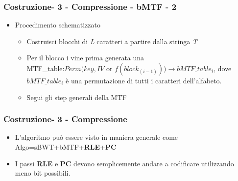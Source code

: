 \documentclass{beamer}
\begin{document}
\begin{frame}
\frametitle{Costruzione- 3 - Compressione - bMTF - 2}
	\begin{itemize}
	\item Procedimento schematizzato\pause
		\begin{itemize}
			\item Costruisci blocchi di \textit{L} caratteri a partire dalla stringa \textit{T}\pause
			\item Per il blocco i vine prima generata una\\ MTF\_table:$ Perm(key,IV$ or $f(block_{(i-1)}))\rightarrow bMTF\_table_{i} $, dove $ bMTF\_table_{i} $ è una permutazione di tutti i caratteri dell'alfabeto.\pause
			\item Segui gli step generali della MTF\pause
		\end{itemize}	 
	\end{itemize}
\end{frame}
\begin{frame}
\frametitle{Costruzione- 3 - Compressione }
	\begin{itemize}
		\item L’algoritmo può essere visto in maniera generale come Algo=sBWT+bMTF+\textbf{RLE}+\textbf{PC}\pause
		\item I passi \textbf{RLE} e \textbf{PC} devono semplicemente andare a codificare utilizzando meno bit possibili. \pause
	\end{itemize}
\end{frame}
\end{document}
